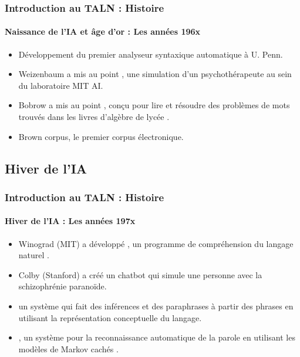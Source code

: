 \documentclass{beamer}
\begin{document}
\begin{frame}
\frametitle{Introduction au TALN : Histoire}
\framesubtitle{Naissance de l'IA et âge d'or : Les années 196x}

\begin{itemize}
	\item {} Développement du premier analyseur syntaxique automatique à U. Penn. \cite{1961-joshi,1962-harris} 
	\item {} Weizenbaum a mis au point , une simulation d'un psychothérapeute au sein du laboratoire MIT AI.
	\item {} Bobrow a mis au point , conçu pour lire et résoudre des problèmes de mots trouvés dans les livres d'algèbre de lycée \cite{1964-bobrow}.
	\item {} Brown corpus, le premier corpus électronique.
\end{itemize}

\end{frame}

\subsection{Hiver de l'IA}

\begin{frame}
\frametitle{Introduction au TALN : Histoire}
\framesubtitle{Hiver de l'IA : Les années 197x}

\begin{itemize}
	\item {} Winograd (MIT) a développé , un programme de compréhension du langage naturel \cite{1971-winograd}.
	\item {} Colby (Stanford) a créé  un chatbot qui simule une personne avec la schizophrénie paranoïde.
	\item {}  un système qui fait des inférences et des paraphrases à partir des phrases en utilisant la représentation conceptuelle du langage. 
	\item {} , un système pour la reconnaissance automatique de la parole en utilisant les modèles de Markov cachés \cite{1975-baker}.
\end{itemize}

\end{frame}
\end{document}
